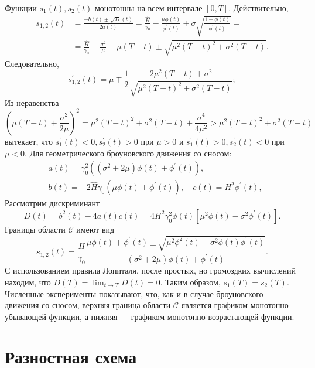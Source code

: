 Функции $s_1(t), s_2(t)$ монотонны на всем интервале $[0,T]$.
Действительно,
\begin{align}
 \label{eq:4.2.4}
s_{1,2}(t)&=\frac{-b(t) \pm \sqrt D(t)}{2 a (t)}=\frac{\widehat H}{\gamma_0}-\frac{\mu \phi(t)}{\phi^\prime(t)} \pm \sigma\sqrt{
\frac{1-\phi(t)}{\phi^\prime(t)}}=\\
&=\frac{\widehat H}{\gamma_0}-\frac{\sigma^2}{\mu}-\mu(T-t) \pm \sqrt{\mu^2(T-t)^2+\sigma^2(T-t)}. \nonumber
\end{align}
Следовательно,
\begin{equation}
 \label{eq:4.2.5}
s_{1,2}^\prime(t)=\mu \mp \frac{1}{2} \frac{2 \mu^2 (T-t) + \sigma^2}{\sqrt{\mu^2(T-t)^2+\sigma^2(T-t)}};
\end{equation}
Из неравенства
\begin{equation*}
(\mu (T-t) + \frac{\sigma^2}{2\mu})^2=\mu^2 (T-t)^2 +\sigma^2 (T-t)+\frac{\sigma^4}{4\mu^2}>\mu^2(T-t)^2+\sigma^2(T-t)
\end{equation*}
вытекает, что $s_{1}^\prime(t)<0, s_{2}^\prime(t)>0$ при $\mu>0$ и $s_{1}^\prime(t)>0, s_{2}^\prime(t)<0$ при $\mu<0$.
Для геометрического броуновского движения со сносом:
\begin{align*}
&a(t)=\gamma_0^2((\sigma^2+2\mu)\phi(t)+\phi^\prime(t)),\\
&b(t)=-2\widehat H\gamma_0(\mu \phi(t)+\phi^\prime(t)),\quad c(t)=H^2 \phi^\prime(t),
\end{align*}
Рассмотрим дискриминант
\begin{equation*}
D(t)=b^2(t)-4a(t)c(t)=4 H^2 \gamma_0^2\phi(t) [\mu^2\phi(t)-\sigma^2 \phi^\prime(t)].
\end{equation*}
Границы области $\mathcal C$ имеют вид
\begin{equation}
 \label{eq:4.2.6}
s_{1,2}(t)=\frac{H}{\gamma_0}\frac{\mu\phi(t)+\phi^\prime(t)\pm \sqrt{\mu^2\phi^2(t)-\sigma^2\phi(t)\phi^\prime(t)}}{(\sigma^2+2\mu)\phi(t)+\phi^\prime(t)}.
\end{equation}
С использованием правила Лопиталя, после простых, но громоздких вычислений находим, что $D(T)=\lim_{t \to T} D(t)=0$. Таким образом, $s_{1}(T)=s_{2}(T)$. Численные эксперименты показывают, что, как и в случае броуновского движения со сносом, верхняя граница области $\mathcal C$ является графиком монотонно убывающей функции, а нижняя --- графиком монотонно возрастающей функции.

\section{Разностная схема}\label{sec:4.4}

